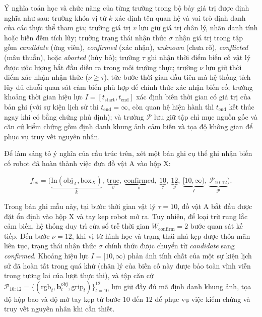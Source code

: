 Ý nghĩa toán học và chức năng của từng trường trong bộ bảy giá trị được định nghĩa như sau: trường khóa vị từ $k$ xác định tên quan hệ và vai trò định danh của các thực thể tham gia; trường giá trị $v$ lưu giữ giá trị chân lý, nhãn danh tính hoặc biến đếm tích lũy; trường trạng thái nhận thức $\sigma$ nhận giá trị trong tập gồm \textit{candidate} (ứng viên), \textit{confirmed} (xác nhận), \textit{unknown} (chưa rõ), \textit{conflicted} (mâu thuẫn), hoặc \textit{aborted} (hủy bỏ); trường $\tau$ ghi nhận thời điểm biến cố vật lý được ước lượng bắt đầu diễn ra trong môi trường thực; trường $\nu$ lưu giữ thời điểm xác nhận nhận thức ($\nu \ge \tau$), tức bước thời gian đầu tiên mà hệ thống tích lũy đủ chuỗi quan sát cảm biến phù hợp để chính thức xác nhận biến cố; trường khoảng thời gian hiệu lực $I = [t_{\mathrm{start}}, t_{\mathrm{end}}]$ xác định biên thời gian có giá trị của bản ghi (với sự kiện lịch sử thì $t_{\mathrm{end}} = \infty$, còn quan hệ hiện hành thì $t_{\mathrm{end}}$ kết thúc ngay khi có bằng chứng phủ định); và trường $\mathcal P$ lưu giữ tập chỉ mục nguồn gốc và căn cứ kiểm chứng gồm định danh khung ảnh cảm biến và tọa độ không gian để phục vụ truy vết nguyên nhân.

Để làm sáng tỏ ý nghĩa của cấu trúc trên, xét một bản ghi cụ thể ghi nhận biến cố robot đã hoàn thành việc đưa đồ vật A vào hộp X:

\begin{equation}
f_{\mathrm{ex}} = \Big(\underbrace{\text{In}(\text{obj}_A, \text{box}_X)}_{k},\ \underbrace{\text{true}}_{v},\ \underbrace{\text{confirmed}}_{\sigma},\ \underbrace{10}_{\tau},\ \underbrace{12}_{\nu},\ \underbrace{[10, \infty)}_{I},\ \underbrace{\mathcal P_{10:12}}_{\mathcal P}\Big).
\label{eq:record-example}
\end{equation}

Trong bản ghi mẫu này, tại bước thời gian vật lý $\tau = 10$, đồ vật A bắt đầu được đặt ổn định vào hộp X và tay kẹp robot mở ra. Tuy nhiên, để loại trừ rung lắc cảm biến, hệ thống duy trì cửa sổ trễ thời gian $W_{\mathrm{confirm}} = 2$ bước quan sát kế tiếp. Đến bước $\nu = 12$, khi vị từ hình học và trạng thái nhả kẹp được thỏa mãn liên tục, trạng thái nhận thức $\sigma$ chính thức được chuyển từ \textit{candidate} sang \textit{confirmed}. Khoảng hiệu lực $I = [10, \infty)$ phản ánh tính chất của một sự kiện lịch sử đã hoàn tất trong quá khứ (chân lý của biến cố này được bảo toàn vĩnh viễn trong tương lai của lượt thực thi), và tập căn cứ $\mathcal P_{10:12} = \{(\text{rgb}_t, \mathbf b_t^{\mathrm{obj}}, \text{grip}_t)\}_{t=10}^{12}$ lưu giữ đầy đủ mã định danh khung ảnh, tọa độ hộp bao và độ mở tay kẹp từ bước 10 đến 12 để phục vụ việc kiểm chứng và truy vết nguyên nhân khi cần thiết.

